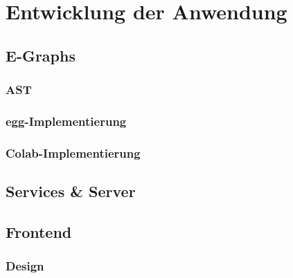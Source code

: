 \section{Entwicklung der Anwendung}\label{sec:entwicklung}

\subsection{E-Graphs}

\subsubsection{AST}

\subsubsection{egg-Implementierung}

\subsubsection{Colab-Implementierung}

\subsection{Services \& Server}

\subsection{Frontend}

\subsubsection{Design}
